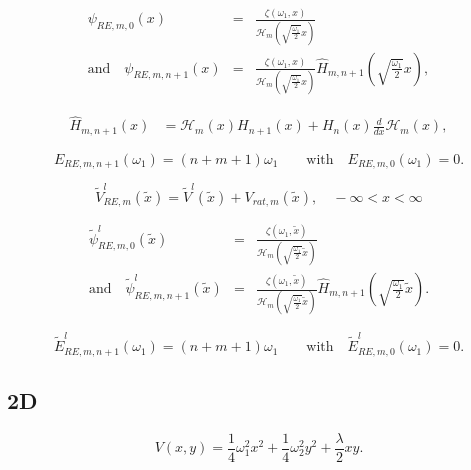 \documentclass[12pt]{article}
\newcommand{\td}[1]{\tilde{#1}}
\begin{document}
\begin{eqnarray}\label{1D-psi-RE-x}
  \psi_{RE,m,0}(x) &=& \frac{\zeta\left(\omega_1,x\right)}{\mathcal{H}_m\left(\sqrt{\frac{\omega_1}{2}} x\right)}\nonumber\\
\mbox{and} \quad 
  \psi_{RE,m,n+1}(x) &=& \frac{\zeta\left(\omega_1,x\right)}{\mathcal{H}_m\left(\sqrt{\frac{\omega_1}{2}} x\right)}\hat{H}_{m,n+1}\left(\sqrt{\frac{\omega_1}{2}} x\right),
\end{eqnarray}

\begin{align}
  \hat{H}_{m,n+1}(x) &= \mathcal{H}_m(x) H_{n+1}(x) + H_n(x) \frac{d}{dx} \mathcal{H}_m(x),
\end{align}

\begin{equation}\label{1D-E_RE-x}
E_{RE,m, n+1}(\omega_{1})=\left(n+m+1\right)\omega_1 \qquad\mbox{with}\quad E_{RE,m,0}(\omega_{1})=0.
\end{equation}

\begin{equation}\label{1D-V-RE-I}
    \tilde{V}_{RE,m}^l(\td{x}) = \td{V}^l(\td{x}) + V_{rat,m}\left(\td{x}\right), \quad -\infty < x < \infty
\end{equation}

\begin{eqnarray}\label{1D-psi-RE-I}
		\td{\psi}_{RE,m,0}^l(\td{x}) &=& \frac{\zeta\left(\omega_1,\td{x}\right)}{\mathcal{H}_m\left(\sqrt{\frac{\omega_1}{2}} \td{x}\right)}\nonumber\\
\mbox{and} \quad 
    \td{\psi}_{RE,m,n+1}^l(\td{x}) &=& \frac{\zeta\left(\omega_1,\td{x}\right)}{\mathcal{H}_m\left(\sqrt{\frac{\omega_1}{2}} \td{x}\right)}\hat{H}_{m,n+1}\left(\sqrt{\frac{\omega_1}{2}} \td{x}\right).
\end{eqnarray}

\begin{equation}\label{1D-E_RE-I}
	\td{E}_{RE,m, n+1}^l(\omega_{1})=\left(n+m+1\right)\omega_1 \qquad\mbox{with}\quad \td{E}_{RE,m,0}^l(\omega_{1})=0.
\end{equation}


\subsection*{2D}
\begin{equation}\label{2D-V-II}
  V(x,y)= \frac{1}{4}\omega_1^2x^2+\frac{1}{4}\omega_2^2y^2+\frac{\lambda}{2} xy.
\end{equation}
\end{document}
